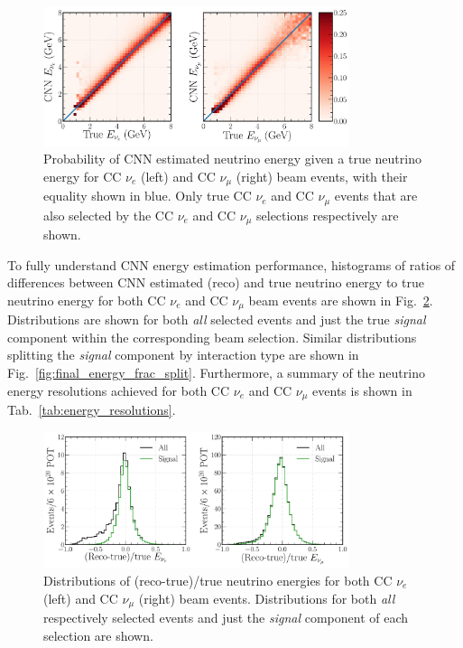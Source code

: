 \begin{figure} %
    \includegraphics[width=0.8\textwidth]{diagrams/7-results/final_energy_2d.pdf}
    \caption[Probability of CNN estimated neutrino energy given a true neutrino energy]
    {Probability of CNN estimated neutrino energy given a true neutrino energy for CC $\nu_{e}$
        (left) and CC $\nu_{\mu}$ (right) beam events, with their equality shown in blue. Only
        true CC $\nu_{e}$ and CC $\nu_{\mu}$ events that are also selected by the CC $\nu_{e}$ and
        CC $\nu_{\mu}$ selections respectively are shown.}
    \label{fig:final_energy_2d}
\end{figure}

To fully understand CNN energy estimation performance, histograms of ratios of differences between
CNN estimated (reco) and true neutrino energy to true neutrino energy for both CC $\nu_{e}$ and CC
$\nu_{\mu}$ beam events are shown in Fig.~\ref{fig:final_energy_frac}. Distributions are shown for
both \emph{all} selected events and just the true \emph{signal} component within the corresponding
beam selection. Similar distributions splitting the \emph{signal} component by interaction type
are shown in Fig.~\ref{fig:final_energy_frac_split}. Furthermore, a summary of the neutrino energy
resolutions achieved for both CC $\nu_{e}$ and CC $\nu_{\mu}$ events is shown in
Tab.~\ref{tab:energy_resolutions}.

\begin{figure} %
    \includegraphics[width=0.8\textwidth]{diagrams/7-results/final_energy_frac.pdf}
    \caption[Distributions of (reco-true)/true neutrino energies]
    {Distributions of (reco-true)/true neutrino energies for both CC $\nu_{e}$ (left) and CC
        $\nu_{\mu}$ (right) beam events. Distributions for both \emph{all} respectively selected
        events and just the \emph{signal} component of each selection are shown.}
    \label{fig:final_energy_frac}
\end{figure}

